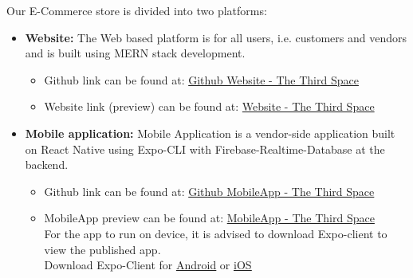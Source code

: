 

Our E-Commerce store is divided into two platforms:
\begin{itemize}
     \item \textbf{Website:} The Web based platform is for all users, i.e. customers and vendors and is built using MERN stack development.
     \begin{itemize}
         \item Github link can be found at: \href{https://github.com/ahsanqadeer10/thethirdspace}{Github Website - The Third Space}
         \item Website link (preview) can be found at: \href{https://thethirdspace.herokuapp.com/}{Website - The Third Space}
     \end{itemize}
     \item \textbf{Mobile application:} Mobile Application is a vendor-side application built on React Native using Expo-CLI with Firebase-Realtime-Database at the backend.
     \begin{itemize}
         \item Github link can be found at: \href{https://github.com/aimanahmedmoin1997/TheThirdSpaceMobileApp}{Github MobileApp - The Third Space}
         \item MobileApp preview can be found at: \href{https://expo.io/@aamoin/first}{MobileApp - The Third Space}\\For the app to run on device, it is advised to download Expo-client to view the published app.\\Download Expo-Client for \href{http://bit.ly/2bZq5ew}{\underline{Android}} or \href{http://apple.co/2c6HMtp}{\underline{iOS}}
     \end{itemize}
\end{itemize}

